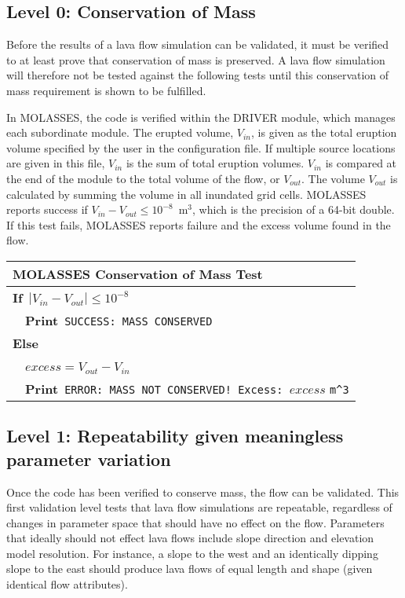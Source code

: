 	\subsection{Level 0: Conservation of Mass}
			Before the results of a lava flow simulation can be validated, it must be verified to at least prove that conservation of mass is preserved. A lava flow simulation will therefore not be tested against the following tests until this conservation of mass requirement is shown to be fulfilled.
			
			In MOLASSES, the code is verified within the DRIVER module, which manages each subordinate module. The erupted volume, $V_{in}$, is given as the total eruption volume specified by the user in the configuration file. If multiple source locations are given in this file, $V_{in}$ is the sum of total eruption volumes. $V_{in}$ is compared at the end of the module to the total volume of the flow, or $V_{out}$. The volume $V_{out}$ is calculated by summing the volume in all inundated grid cells. MOLASSES reports success if $V_{in}-V_{out} \le 10^{-8}$~m$^3$, which is the precision of a 64-bit double. If this test fails, MOLASSES reports failure and the excess volume found in the flow.
	
			\begin{center}
				\begin{tabular}{l}
					\toprule
					\textbf{MOLASSES Conservation of Mass Test}\\
					\midrule
					\textbf{If}~$|V_{in}-V_{out}| \le 10^{-8}$\\
					~~\textbf{Print}~\verb|SUCCESS: MASS CONSERVED|\\
					\textbf{Else}\\
					~~$excess = V_{out}-V_{in}$\\
					~~\textbf{Print}~\verb|ERROR: MASS NOT CONSERVED! Excess: |$excess$ \verb|m^3|\\
					\bottomrule
				\end{tabular}
			\end{center}

	\subsection{Level 1: Repeatability given meaningless parameter variation}
		Once the code has been verified to conserve mass, the flow can be validated. This first validation level tests that lava flow simulations are repeatable, regardless of changes in parameter space that should have no effect on the flow. Parameters that ideally should not effect lava flows include slope direction and elevation model resolution. For instance, a slope to the west and an identically dipping slope to the east should produce lava flows of equal length and shape (given identical flow attributes).
		

